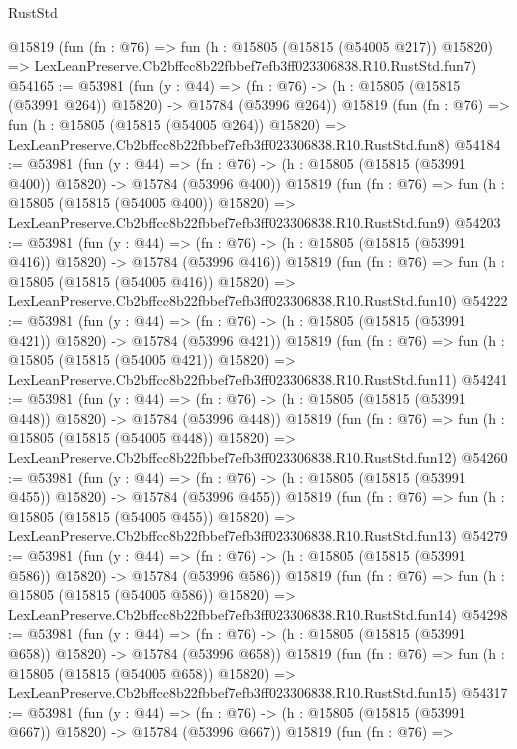 \begin{lexlean}{RustStd}
\begin{coremodule}
    @15819
    (fun (fn : @76) =>
    fun (h : @15805 (@15815 (@54005 @217)) @15820) =>
    LexLeanPreserve.Cb2bffcc8b22fbbef7efb3ff023306838.R10.RustStd.fun7)
@54165 := @53981
    (fun (y : @44) =>
    (fn : @76) -> (h : @15805 (@15815 (@53991 @264)) @15820) -> @15784 (@53996 @264))
    @15819
    (fun (fn : @76) =>
    fun (h : @15805 (@15815 (@54005 @264)) @15820) =>
    LexLeanPreserve.Cb2bffcc8b22fbbef7efb3ff023306838.R10.RustStd.fun8)
@54184 := @53981
    (fun (y : @44) =>
    (fn : @76) -> (h : @15805 (@15815 (@53991 @400)) @15820) -> @15784 (@53996 @400))
    @15819
    (fun (fn : @76) =>
    fun (h : @15805 (@15815 (@54005 @400)) @15820) =>
    LexLeanPreserve.Cb2bffcc8b22fbbef7efb3ff023306838.R10.RustStd.fun9)
@54203 := @53981
    (fun (y : @44) =>
    (fn : @76) -> (h : @15805 (@15815 (@53991 @416)) @15820) -> @15784 (@53996 @416))
    @15819
    (fun (fn : @76) =>
    fun (h : @15805 (@15815 (@54005 @416)) @15820) =>
    LexLeanPreserve.Cb2bffcc8b22fbbef7efb3ff023306838.R10.RustStd.fun10)
@54222 := @53981
    (fun (y : @44) =>
    (fn : @76) -> (h : @15805 (@15815 (@53991 @421)) @15820) -> @15784 (@53996 @421))
    @15819
    (fun (fn : @76) =>
    fun (h : @15805 (@15815 (@54005 @421)) @15820) =>
    LexLeanPreserve.Cb2bffcc8b22fbbef7efb3ff023306838.R10.RustStd.fun11)
@54241 := @53981
    (fun (y : @44) =>
    (fn : @76) -> (h : @15805 (@15815 (@53991 @448)) @15820) -> @15784 (@53996 @448))
    @15819
    (fun (fn : @76) =>
    fun (h : @15805 (@15815 (@54005 @448)) @15820) =>
    LexLeanPreserve.Cb2bffcc8b22fbbef7efb3ff023306838.R10.RustStd.fun12)
@54260 := @53981
    (fun (y : @44) =>
    (fn : @76) -> (h : @15805 (@15815 (@53991 @455)) @15820) -> @15784 (@53996 @455))
    @15819
    (fun (fn : @76) =>
    fun (h : @15805 (@15815 (@54005 @455)) @15820) =>
    LexLeanPreserve.Cb2bffcc8b22fbbef7efb3ff023306838.R10.RustStd.fun13)
@54279 := @53981
    (fun (y : @44) =>
    (fn : @76) -> (h : @15805 (@15815 (@53991 @586)) @15820) -> @15784 (@53996 @586))
    @15819
    (fun (fn : @76) =>
    fun (h : @15805 (@15815 (@54005 @586)) @15820) =>
    LexLeanPreserve.Cb2bffcc8b22fbbef7efb3ff023306838.R10.RustStd.fun14)
@54298 := @53981
    (fun (y : @44) =>
    (fn : @76) -> (h : @15805 (@15815 (@53991 @658)) @15820) -> @15784 (@53996 @658))
    @15819
    (fun (fn : @76) =>
    fun (h : @15805 (@15815 (@54005 @658)) @15820) =>
    LexLeanPreserve.Cb2bffcc8b22fbbef7efb3ff023306838.R10.RustStd.fun15)
@54317 := @53981
    (fun (y : @44) =>
    (fn : @76) -> (h : @15805 (@15815 (@53991 @667)) @15820) -> @15784 (@53996 @667))
    @15819
    (fun (fn : @76) =>

\end{coremodule}
\end{lexlean}
